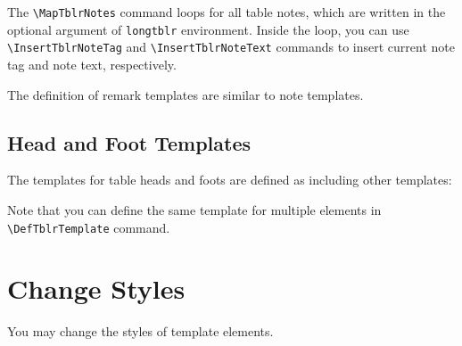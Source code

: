 \documentclass[oneside]{book}
\begin{document}
The \verb!\MapTblrNotes! command loops for all table notes,
which are written in the optional argument of \verb!longtblr! environment.
Inside the loop, you can use \verb!\InsertTblrNoteTag! and \verb!\InsertTblrNoteText!
commands to insert current note tag and note text, respectively.

The definition of remark templates are similar to note templates.
\nopagebreak
\begin{codehigh}
\end{codehigh}
\begin{codehigh}
\end{codehigh}

\subsection{Head and Foot Templates}

The templates for table heads and foots are defined as including other templates:

\begin{codehigh}
\end{codehigh}

Note that you can define the same template for multiple elements in \verb!\DefTblrTemplate! command.

\section{Change Styles}

You may change the styles of template elements.

\begin{codehigh}
\end{codehigh}
\end{document}
